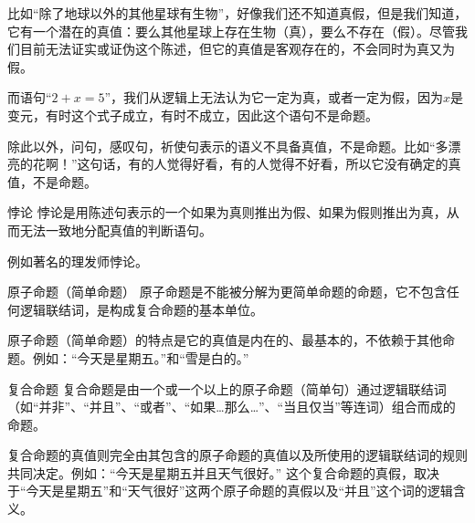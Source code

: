 \documentclass[lang=cn,11pt]{elegantbook}
\begin{document}
比如“除了地球以外的其他星球有生物”，好像我们还不知道真假，但是我们知道，它有一个潜在的真值：要么其他星球上存在生物（真），要么不存在（假）。尽管我们目前无法证实或证伪这个陈述，但它的真值是客观存在的，不会同时为真又为假。

而语句“$2+x=5$”，我们从逻辑上无法认为它一定为真，或者一定为假，因为$x$是变元，有时这个式子成立，有时不成立，因此这个语句不是命题。

除此以外，问句，感叹句，祈使句表示的语义不具备真值，不是命题。比如“多漂亮的花啊！”这句话，有的人觉得好看，有的人觉得不好看，所以它没有确定的真值，不是命题。
\begin{definition}{悖论}
悖论是用陈述句表示的一个如果为真则推出为假、如果为假则推出为真，从而无法一致地分配真值的判断语句。
\end{definition}
例如著名的理发师悖论。
\begin{definition}{原子命题（简单命题）}
原子命题是不能被分解为更简单命题的命题，它不包含任何逻辑联结词，是构成复合命题的基本单位。
\end{definition}
原子命题（简单命题）的特点是它的真值是内在的、最基本的，不依赖于其他命题。例如：“今天是星期五。”和“雪是白的。”
\begin{definition}{复合命题}
复合命题是由一个或一个以上的原子命题（简单句）通过逻辑联结词（如“并非”、“并且”、“或者”、“如果…那么…”、“当且仅当”等连词）组合而成的命题。
\end{definition}
复合命题的真值则完全由其包含的原子命题的真值以及所使用的逻辑联结词的规则共同决定。例如：“今天是星期五并且天气很好。” 这个复合命题的真假，取决于“今天是星期五”和“天气很好”这两个原子命题的真假以及“并且”这个词的逻辑含义。
\end{document}
